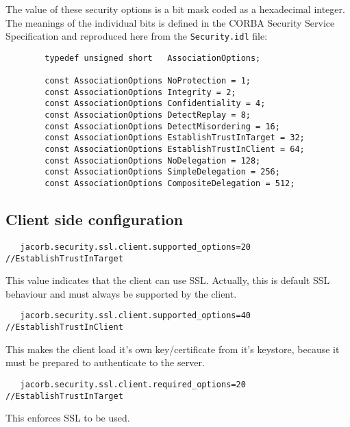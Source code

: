 \documentclass[12pt]{scrbook}
\begin{document}
The  value  of  these security  options  is  a  bit  mask coded  as  a
hexadecimal integer. The meanings of the individual bits is defined in
the CORBA Security Service  Specification and reproduced here from the
{\tt Security.idl} file:

\begin{verbatim}
        typedef unsigned short   AssociationOptions;

        const AssociationOptions NoProtection = 1;
        const AssociationOptions Integrity = 2;
        const AssociationOptions Confidentiality = 4;
        const AssociationOptions DetectReplay = 8;
        const AssociationOptions DetectMisordering = 16;
        const AssociationOptions EstablishTrustInTarget = 32;
        const AssociationOptions EstablishTrustInClient = 64;
        const AssociationOptions NoDelegation = 128;
        const AssociationOptions SimpleDelegation = 256;
        const AssociationOptions CompositeDelegation = 512;
\end{verbatim}


\subsection{Client side configuration}

\begin{verbatim}
   jacorb.security.ssl.client.supported_options=20 //EstablishTrustInTarget
\end{verbatim}
This value indicates that the client can use SSL. Actually, this is default
SSL behaviour and must always be supported by the client.

\begin{verbatim}
   jacorb.security.ssl.client.supported_options=40 //EstablishTrustInClient
\end{verbatim}
This makes the client load it's own key/certificate from it's
keystore, because it must be prepared to authenticate to the server.

\begin{verbatim}
   jacorb.security.ssl.client.required_options=20 //EstablishTrustInTarget
\end{verbatim}
This enforces SSL to be used.
\end{document}
